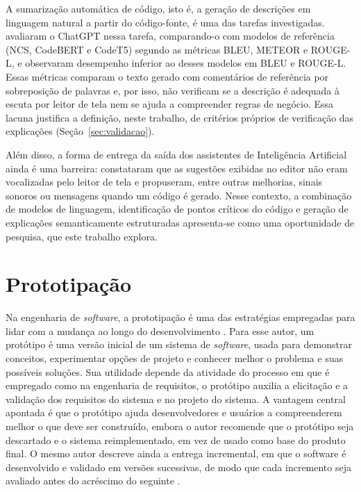 \documentclass[
    12pt,                   %
    openright,              %
    oneside,                %
    a4paper,                %
    sumario=tradicional,    %
    english,                %
    brazil,                 %
    ]{abntex2}
\begin{document}
A sumarização automática de código, isto é, a geração de descrições em linguagem natural a partir do código-fonte, é uma das tarefas investigadas. \textcite{sun2023chatgptsum} avaliaram o ChatGPT nessa tarefa, comparando-o com modelos de referência (NCS, CodeBERT e CodeT5) segundo as métricas BLEU, METEOR e ROUGE-L, e observaram desempenho inferior ao desses modelos em BLEU e ROUGE-L. Essas métricas comparam o texto gerado com comentários de referência por sobreposição de palavras e, por isso, não verificam se a descrição é adequada à escuta por leitor de tela nem se ajuda a compreender regras de negócio. Essa lacuna justifica a definição, neste trabalho, de critérios próprios de verificação das explicações (Seção~\ref{sec:validacao}).

Além disso, a forma de entrega da saída dos assistentes de Inteligência Artificial ainda é uma barreira: \textcite{latinoware34224} constataram que as sugestões exibidas no editor não eram vocalizadas pelo leitor de tela e propuseram, entre outras melhorias, sinais sonoros ou mensagens quando um código é gerado. Nesse contexto, a combinação de modelos de linguagem, identificação de pontos críticos do código e geração de explicações semanticamente estruturadas apresenta-se como uma oportunidade de pesquisa, que este trabalho explora.

\section{Prototipação}\label{sec:Prototipacao}

Na engenharia de \textit{software}, a prototipação é uma das estratégias empregadas para lidar com a mudança ao longo do desenvolvimento \cite{sommerville2018}. Para esse autor, um protótipo é uma versão inicial de um sistema de \textit{software}, usada para demonstrar conceitos, experimentar opções de projeto e conhecer melhor o problema e suas possíveis soluções. Sua utilidade depende da atividade do processo em que é empregado como na engenharia de requisitos, o protótipo auxilia a elicitação e a validação dos requisitos do sistema e no projeto do sistema. A vantagem central apontada é que o protótipo ajuda desenvolvedores e usuários a compreenderem melhor o que deve ser construído, embora o autor recomende que o protótipo seja descartado e o sistema reimplementado, em vez de usado como base do produto final. O mesmo autor descreve ainda a entrega incremental, em que o software é desenvolvido e validado em versões sucessivas, de modo que cada incremento seja avaliado antes do acréscimo do seguinte \cite{sommerville2018}.
\end{document}
